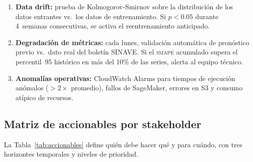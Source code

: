 \documentclass[12pt, letterpaper]{article}
\newcommand{\smape}{\textnormal{\textsc{smape}}}
\newcommand{\tabref}[1]{Tabla~\ref{#1}}
\begin{document}
\begin{enumerate}
  \item \textbf{Data drift:} prueba de Kolmogorov-Smirnov sobre la distribución de los datos entrantes vs.~los datos de entrenamiento. Si $p < 0.05$ durante 4~semanas consecutivas, se activa el reentrenamiento anticipado.
  \item \textbf{Degradación de métricas:} cada lunes, validación automática de pronóstico previo vs.~dato real del boletín SINAVE. Si el \smape{} acumulado supera el percentil~95 histórico en más del 10\% de las series, alerta al equipo técnico.
  \item \textbf{Anomalías operativas:} CloudWatch Alarms para tiempos de ejecución anómalos ($>2\times$ promedio), fallos de SageMaker, errores en S3 y consumo atípico de recursos.
\end{enumerate}

\subsection{Matriz de accionables por stakeholder}

La \tabref{tab:accionables} define quién debe hacer qué y para cuándo, con tres horizontes temporales y niveles de prioridad.
\end{document}
